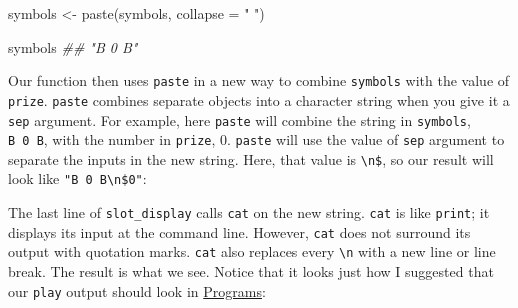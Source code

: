 \documentclass[
  letterpaper,
  DIV=11,
  numbers=noendperiod]{scrbook}
\newenvironment{Shaded}{\begin{snugshade}}{\end{snugshade}}
\newcommand{\AttributeTok}[1]{\textcolor[rgb]{0.40,0.45,0.13}{#1}}
\newcommand{\DocumentationTok}[1]{\textcolor[rgb]{0.37,0.37,0.37}{\textit{#1}}}
\newcommand{\FunctionTok}[1]{\textcolor[rgb]{0.28,0.35,0.67}{#1}}
\newcommand{\NormalTok}[1]{\textcolor[rgb]{0.00,0.23,0.31}{#1}}
\newcommand{\OtherTok}[1]{\textcolor[rgb]{0.00,0.23,0.31}{#1}}
\newcommand{\SpecialCharTok}[1]{\textcolor[rgb]{0.37,0.37,0.37}{#1}}
\newcommand{\StringTok}[1]{\textcolor[rgb]{0.13,0.47,0.30}{#1}}
\begin{document}
\begin{Shaded}
\begin{Highlighting}[]
\NormalTok{symbols }\OtherTok{\textless{}{-}} \FunctionTok{paste}\NormalTok{(symbols, }\AttributeTok{collapse =} \StringTok{" "}\NormalTok{)}

\NormalTok{symbols}
\DocumentationTok{\#\# "B 0 B"}
\end{Highlighting}
\end{Shaded}

Our function then uses \texttt{paste} in a new way to combine
\texttt{symbols} with the value of \texttt{prize}. \texttt{paste}
combines separate objects into a character string when you give it a
\texttt{sep} argument. For example, here \texttt{paste} will combine the
string in \texttt{symbols}, \texttt{B\ 0\ B}, with the number in
\texttt{prize}, 0. \texttt{paste} will use the value of \texttt{sep}
argument to separate the inputs in the new string. Here, that value is
\texttt{\textbackslash{}n\$}, so our result will look like
\texttt{"B\ 0\ B\textbackslash{}n\$0"}:

\begin{Shaded}
\end{Shaded}

The last line of \texttt{slot\_display} calls \texttt{cat} on the new
string. \texttt{cat} is like \texttt{print}; it displays its input at
the command line. However, \texttt{cat} does not surround its output
with quotation marks. \texttt{cat} also replaces every
\texttt{\textbackslash{}n} with a new line or line break. The result is
what we see. Notice that it looks just how I suggested that our
\texttt{play} output should look in \hyperref[sec-programs]{Programs}:

\begin{Shaded}
\end{Shaded}
\end{document}
